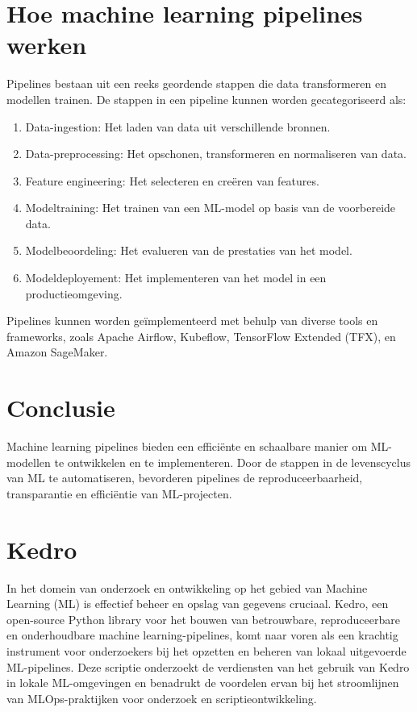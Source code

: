 \section{Hoe machine learning pipelines werken}

Pipelines bestaan uit een reeks geordende stappen die data transformeren en modellen trainen. De stappen in een pipeline kunnen worden gecategoriseerd als:
\begin{enumerate}[label=\arabic*.]
    \item Data-ingestion: Het laden van data uit verschillende bronnen.
    \item Data-preprocessing: Het opschonen, transformeren en normaliseren van data.
    \item Feature engineering: Het selecteren en creëren van features.
    \item Modeltraining: Het trainen van een ML-model op basis van de voorbereide data.
    \item Modelbeoordeling: Het evalueren van de prestaties van het model.
    \item Modeldeployement: Het implementeren van het model in een productieomgeving.
\end{enumerate}
Pipelines kunnen worden geïmplementeerd met behulp van diverse tools en frameworks, zoals Apache Airflow, Kubeflow, TensorFlow Extended (TFX), en Amazon SageMaker.

\section{Conclusie}

Machine learning pipelines bieden een efficiënte en schaalbare manier om ML-modellen te ontwikkelen en te implementeren. Door de stappen in de levenscyclus van ML te automatiseren, bevorderen pipelines de reproduceerbaarheid, transparantie en efficiëntie van ML-projecten.
\section{Kedro}

In het domein van onderzoek en ontwikkeling op het gebied van Machine Learning (ML) is effectief beheer en opslag van gegevens cruciaal. Kedro, een open-source Python library voor het bouwen van betrouwbare, reproduceerbare en onderhoudbare machine learning-pipelines, komt naar voren als een krachtig instrument voor onderzoekers bij het opzetten en beheren van lokaal uitgevoerde ML-pipelines. Deze scriptie onderzoekt de verdiensten van het gebruik van Kedro in lokale ML-omgevingen en benadrukt de voordelen ervan bij het stroomlijnen van MLOps-praktijken voor onderzoek en scriptieontwikkeling.

